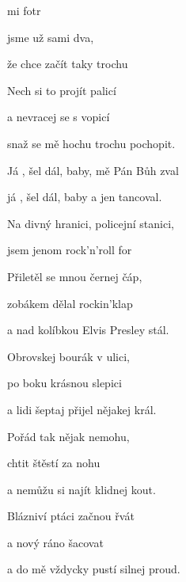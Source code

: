 

\zs
{} mi fotr 

 jsme už sami dva,

že  chce začít taky trochu 

Nech si to projít palicí

a nevracej se s vopicí

snaž se mě hochu trochu pochopit.
\ks

\zr
Já , šel dál, baby,  mě Pán Bůh zval

já , šel dál, baby a  jen tancoval.

Na  divný hranici,  policejní stanici,

 jsem jenom rock'n'roll for 
\kr

\zs
Přiletěl se mnou černej čáp,

zobákem dělal rockin'klap

a nad kolíbkou Elvis Presley stál.

Obrovskej bourák v ulici,

po boku krásnou slepici

a lidi šeptaj přijel nějakej král.
\ks

\zr  \kr

\zs
Pořád tak nějak nemohu,

chtit štěstí za nohu

a nemůžu si najít klidnej kout.

Blázniví ptáci začnou řvát

a nový ráno šacovat

a do mě vždycky pustí silnej proud.
\ks

\zr  \kr

\kp





